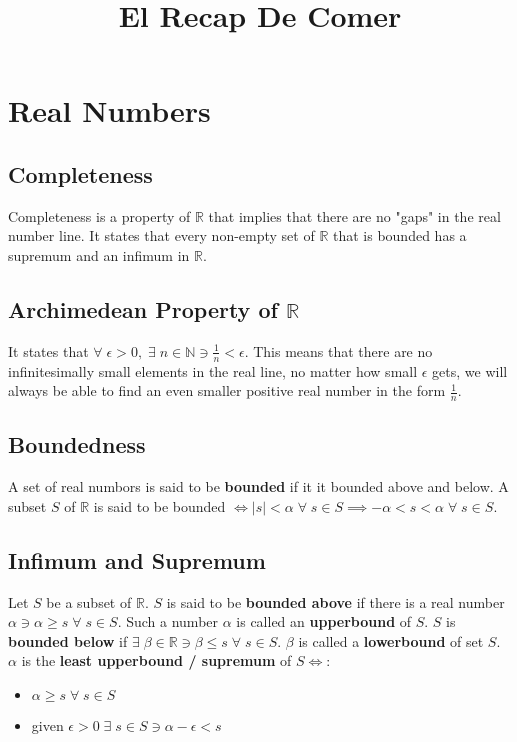 \documentclass[12pt, a4paper]{article}
\title{El Recap De Comer}
\newcommand{\ex}{\; \exists \;}
\newcommand{\real}{\mathbb{R}}
\newcommand{\nat}{\mathbb{N}}
\newcommand{\all}{\; \forall \;}
\begin{document}
\maketitle

\section{Real Numbers}

\subsection{Completeness}
Completeness is a property of $\mathbb{R}$ that implies that there are no
"gaps" in the real number line. It states that every non-empty set of 
$\real$ that is bounded has a supremum and an infimum in $\real$. 

\subsection{Archimedean Property of $\real$}
It states that $\forall \; \epsilon > 0, \ex n \in \nat \ni \frac{1}{n}
< \epsilon$.
This means that there are no infinitesimally small elements in the real
line, no matter how small $\epsilon$ gets, we will always be able to find
an even smaller positive real number in the form $\frac{1}{n}$.

\subsection{Boundedness}
A set of real numbors is said to be \textbf{bounded} if it it bounded
above and below. A subset $S$ of $\real$ is said to be bounded $\iff
|s| < \alpha \all s \in S \implies -\alpha < s < \alpha \all s \in S$.

\subsection{Infimum and Supremum}
Let $S$ be a subset of $\mathbb{R}$. $S$ is said to be \textbf{bounded above}
if there is a real number $\alpha \ni \alpha \geq s \; \forall \; s \in S$.
Such a number $\alpha$ is called an \textbf{upperbound} of $S$.
$S$ is \textbf{bounded below} if $\exists \; \beta \in \mathbb{R} \ni \beta
\leq s \; \forall \; s \in S$. $\beta$ is called a \textbf{lowerbound} of
set $S$. \\

$\alpha$ is the \textbf{least upperbound / supremum} of $S \iff$:
\begin{itemize}
  \item $\alpha \geq s \; \forall \; s \in S$
  \item given $\epsilon > 0 \ex s \in S \ni \alpha - \epsilon < s$ 
\end{itemize}
\end{document}
